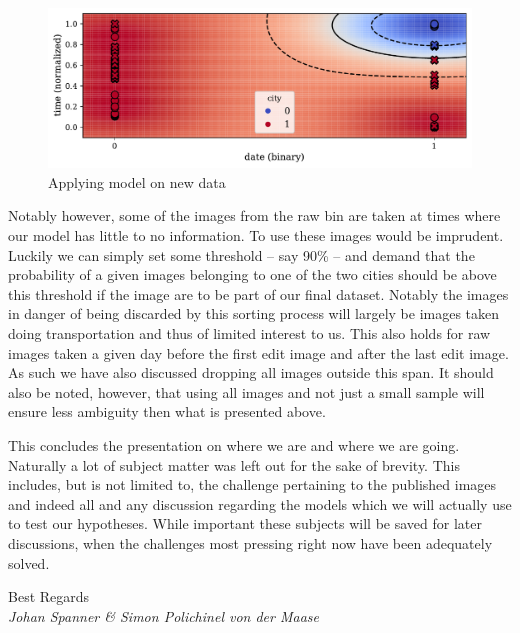 \documentclass[a4paper]{article}
\begin{document}
\begin{figure}[!htb]
	\centering
	\caption{Applying model on new data}\label{predImg}
	\includegraphics[scale=0.65]{pred_img.pdf}
\end{figure}

Notably however, some of the images from the raw bin are taken at times where our model has little to no information. To use these images would be imprudent. Luckily we can simply set some threshold -- say 90\% -- and demand that the probability of a given images belonging to one of the two cities should be above this threshold if the image are to be part of our final dataset. Notably the images in danger of being discarded by this sorting process will largely be images taken doing transportation and thus of limited interest to us. This also holds for raw images taken a given day before the first edit image and after the last edit image. As such we have also discussed dropping all images outside this span. It should also be noted, however, that using all images and not just a small sample will ensure less ambiguity then what is presented above.\par

This concludes the presentation on where we are and where we are going. Naturally a lot of subject matter was left out for the sake of brevity. This includes, but is not limited to, the challenge pertaining to the published images and indeed all and any discussion regarding the models which we will actually use to test our hypotheses. While important these subjects will be saved for later discussions, when the challenges most pressing right now have been adequately solved.\par

Best Regards\\
\emph{Johan Spanner \& Simon Polichinel von der Maase}

\pagebreak

 
\end{document}
